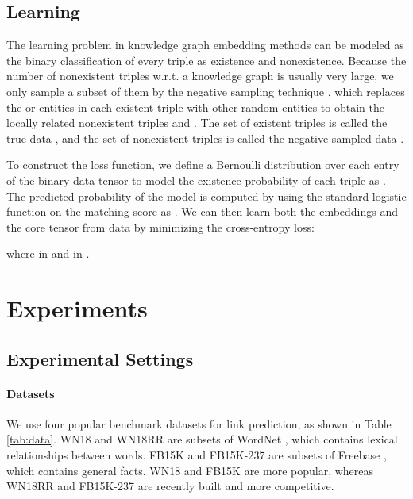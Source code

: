 \documentclass{ecai}
\theoremstyle{plain}  \newtheorem{thm}{Theorem}  \newtheorem{lem}[thm]{Lemma}  \newtheorem{prop}[thm]{Proposition}
\theoremstyle{remark}  \newtheorem*{rem}{Remark}
\begin{document}
\subsection{Learning}
The learning problem in knowledge graph embedding methods can be modeled as the binary classification of every triple as existence and nonexistence. Because the number of nonexistent triples w.r.t. a knowledge graph is usually very large, we only sample a subset of them by the negative sampling technique \cite{mikolov_efficientestimationword_2013}, which replaces the  or  entities in each existent triple  with other random entities to obtain the locally related nonexistent triples  and  \cite{bordes_translatingembeddingsmodeling_2013}. The set of existent triples is called the true data , and the set of nonexistent triples is called the negative sampled data .

To construct the loss function, we define a Bernoulli distribution over each entry of the binary data tensor  to model the existence probability of each triple as . The predicted probability of the model is computed by using the standard logistic function on the matching score as . We can then learn both the embeddings and the core tensor from data by minimizing the cross-entropy loss:

where  in  and  in . 


\section{Experiments} \label{sect:experiment} 

\subsection{Experimental Settings} \label{sect:expsetting} \paragraph{Datasets}
We use four popular benchmark datasets for link prediction, as shown in Table \ref{tab:data}. WN18 \cite{bordes_translatingembeddingsmodeling_2013} and WN18RR \cite{dettmers_convolutional2dknowledge_2018} are subsets of WordNet \cite{millergeorgea._wordnetlexicaldatabase_1995}, which contains lexical relationships between words. FB15K \cite{bordes_translatingembeddingsmodeling_2013} and FB15K-237 \cite{toutanova_observedlatentfeatures_2015} are subsets of Freebase \cite{bollacker_freebasecollaborativelycreated_2008}, which contains general facts. WN18 and FB15K are more popular, whereas WN18RR and FB15K-237 are recently built and more competitive.
\end{document}
